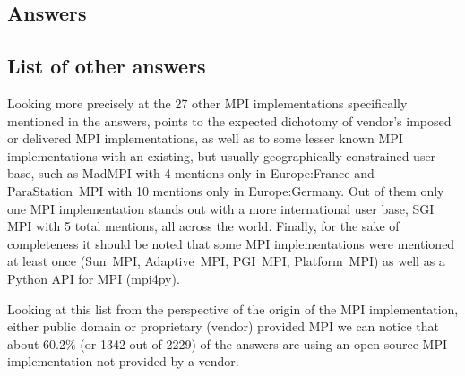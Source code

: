 
\subsection{Answers}


\subsection{List of other answers}

Looking more precisely at the 27 other MPI implementations specifically
mentioned in the answers, points to the expected dichotomy of vendor's imposed
or delivered MPI implementations, as well as to some lesser known MPI
implementations with an existing, but usually geographically constrained user
base, such as MadMPI with 4 mentions only in Europe:France and ParaStation~MPI
with 10 mentions only in Europe:Germany. Out of them only one MPI implementation
stands out with a more international user base, SGI MPI with 5 total mentions,
all across the world. Finally, for the sake of completeness it should be noted
that some MPI implementations were mentioned at least once (Sun~MPI,
Adaptive~MPI, PGI~MPI, Platform~MPI) as well as a Python API for MPI (mpi4py).



Looking at this list from the perspective of the origin of the MPI
implementation, either public domain or proprietary (vendor) provided MPI we can
notice that about 60.2\% (or 1342 out of 2229) of the answers are using an open
source MPI implementation not provided by a vendor.

\begin{report}
\begin{itemize}

\end{itemize}
\end{report}

